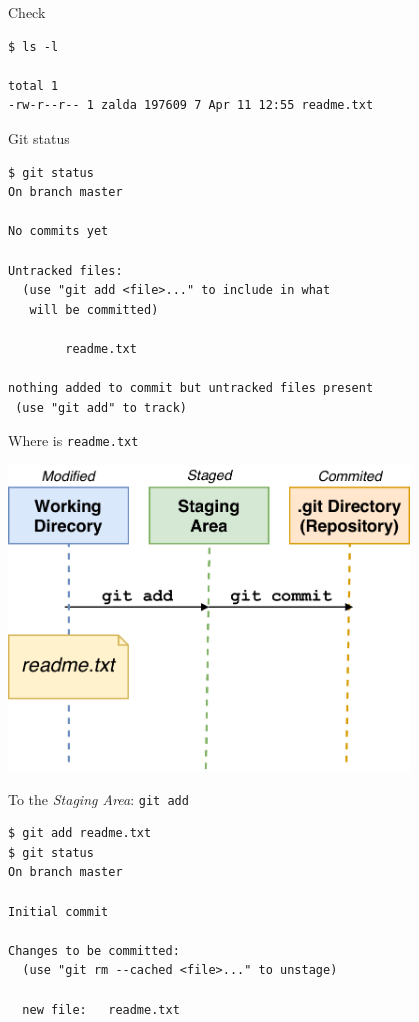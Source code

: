 \documentclass[
  11pt,
  american,
  ignorenonframetext,
  aspectratio=43,
  compress,
  xcolor=dvipsnames]{beamer}
\begin{document}
\begin{frame}[fragile]{Check}
\protect\hypertarget{check}{}
\begin{verbatim}
$ ls -l

total 1
-rw-r--r-- 1 zalda 197609 7 Apr 11 12:55 readme.txt
\end{verbatim}
\end{frame}

\begin{frame}[fragile]{Git status}
\protect\hypertarget{git-status}{}
\begin{verbatim}
$ git status
On branch master

No commits yet

Untracked files:
  (use "git add <file>..." to include in what 
   will be committed)

        readme.txt

nothing added to commit but untracked files present 
 (use "git add" to track)
\end{verbatim}
\end{frame}

\begin{frame}{Where is \texttt{readme.txt}}
\protect\hypertarget{where-is-readme.txt}{}
\begin{center}
\includegraphics[width=0.8\textwidth]{./images/git_workflow_wd.pdf}
\end{center}
\end{frame}

\begin{frame}[fragile]{To the \emph{Staging Area}: \texttt{git\ add}}
\protect\hypertarget{to-the-staging-area-git-add}{}
\begin{verbatim}
$ git add readme.txt
$ git status
On branch master

Initial commit

Changes to be committed:
  (use "git rm --cached <file>..." to unstage)

  new file:   readme.txt
\end{verbatim}
\end{frame}
\end{document}
